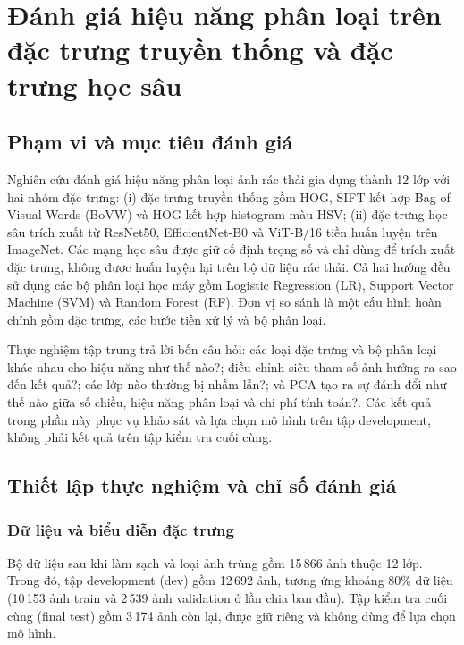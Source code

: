 \section{Đánh giá hiệu năng phân loại trên đặc trưng truyền thống và đặc trưng học sâu}
\label{sec:classification-evaluation}

\subsection{Phạm vi và mục tiêu đánh giá}
\label{sec:scope}
Nghiên cứu đánh giá hiệu năng phân loại ảnh rác thải gia dụng thành 12 lớp với hai nhóm đặc trưng: (i) đặc trưng truyền thống gồm HOG, SIFT kết hợp Bag of Visual Words (BoVW) và HOG kết hợp histogram màu HSV; (ii) đặc trưng học sâu trích xuất từ ResNet50, EfficientNet-B0 và ViT-B/16 tiền huấn luyện trên ImageNet. Các mạng học sâu được giữ cố định trọng số và chỉ dùng để trích xuất đặc trưng, không được huấn luyện lại trên bộ dữ liệu rác thải. Cả hai hướng đều sử dụng các bộ phân loại học máy gồm Logistic Regression (LR), Support Vector Machine (SVM) và Random Forest (RF). Đơn vị so sánh là một cấu hình hoàn chỉnh gồm đặc trưng, các bước tiền xử lý và bộ phân loại.

Thực nghiệm tập trung trả lời bốn câu hỏi: các loại đặc trưng và bộ phân loại khác nhau cho hiệu năng như thế nào?; điều chỉnh siêu tham số ảnh hưởng ra sao đến kết quả?; các lớp nào thường bị nhầm lẫn?; và PCA tạo ra sự đánh đổi như thế nào giữa số chiều, hiệu năng phân loại và chi phí tính toán?. Các kết quả trong phần này phục vụ khảo sát và lựa chọn mô hình trên tập development, không phải kết quả trên tập kiểm tra cuối cùng.

\subsection{Thiết lập thực nghiệm và chỉ số đánh giá}
\label{sec:protocol}
\subsubsection{Dữ liệu và biểu diễn đặc trưng}
Bộ dữ liệu sau khi làm sạch và loại ảnh trùng gồm 15\,866 ảnh thuộc 12 lớp. Trong đó, tập development (dev) gồm 12\,692 ảnh, tương ứng khoảng 80\% dữ liệu (10\,153 ảnh train và 2\,539 ảnh validation ở lần chia ban đầu). Tập kiểm tra cuối cùng (final test) gồm 3\,174 ảnh còn lại, được giữ riêng và không dùng để lựa chọn mô hình.

